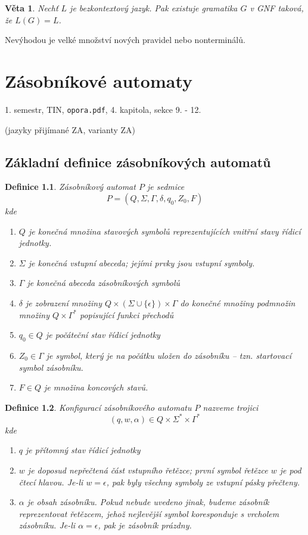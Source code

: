 \documentclass[a4paper, 11pt]{report}
\newtheorem{mydef}{Definice}[chapter]
\newtheorem{veta}{Věta}[chapter]
\begin{document}
\begin{veta}
Nechť $L$ je bezkontextový jazyk. Pak existuje gramatika $G$ v GNF taková, že $L(G) = L$.
\end{veta}

Nevýhodou je velké množství nových pravidel nebo nonterminálů.




\chapter{Zásobníkové automaty} \label{cha:21}
1. semestr, TIN, \texttt{opora.pdf}, 4. kapitola, sekce 9. - 12.

(jazyky přijímané ZA, varianty ZA)

\section{Základní definice zásobníkových automatů}
\begin{mydef}
\emph{Zásobníkový automat} $P$ je sedmice
$$P = (Q, \Sigma, \Gamma, \delta, q_0, Z_0, F)$$
kde
\begin{enumerate}
	\item $Q$ je konečná množina stavových symbolů reprezentujících vnitřní stavy řídicí jednotky.
	\item $\Sigma$ je konečná vstupní abeceda; jejími prvky jsou vstupní symboly.
	\item $\Gamma$ je konečná abeceda zásobníkových symbolů
	\item $\delta$ je zobrazení množiny $Q \times (\Sigma \cup \{\epsilon\}) \times \Gamma$ do konečné množiny podmnožin množiny $Q \times \Gamma^*$ popisující funkci přechodů
	\item $q_0 \in Q$ je počáteční stav řídicí jednotky
	\item $Z_0 \in \Gamma$ je symbol, který je na počátku uložen do zásobníku -- tzn. \emph{startovací symbol} zásobníku.
	\item $F \in Q$ je množina koncových stavů.
\end{enumerate}
\end{mydef}

\begin{mydef}
\emph{Konfigurací} zásobníkového automatu $P$ nazveme trojici
$$(q, w, \alpha) \in Q \times \Sigma^* \times \Gamma^*$$
kde
\begin{enumerate}
	\item $q$ je přítomný stav řídicí jednotky
	\item $w$ je doposud nepřečtená část vstupního řetězce; první symbol řetězce $w$ je pod čtecí hlavou. Je-li $w = \epsilon$, pak byly všechny symboly ze vstupní pásky přečteny.
	\item $\alpha$ je obsah zásobníku. Pokud nebude uvedeno jinak, budeme zásobník reprezentovat řetězcem, jehož nejlevější symbol koresponduje s vrcholem zásobníku. Je-li $\alpha = \epsilon$, pak je zásobník prázdny.
\end{enumerate}
\end{mydef}
\end{document}
